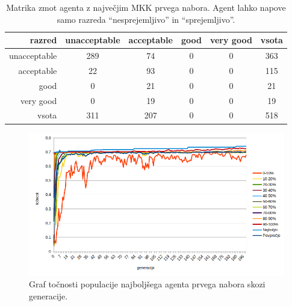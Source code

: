 \begin{table}[H]
    \centering
    \begin{tabular}{||rccccc||}
        \hline
        razred       & unacceptable & acceptable & good & very good & vsota \\ \hline
        unacceptable & 289          & 74         & 0    & 0         & 363   \\ \hline
        acceptable   & 22           & 93         & 0    & 0         & 115   \\ \hline
        good         & 0            & 21         & 0    & 0         & 21    \\ \hline
        very good    & 0            & 19         & 0    & 0         & 19    \\ \hline
        vsota        & 311          & 207        & 0    & 0         & 518   \\ \hline
    \end{tabular}
    \caption{Matrika zmot agenta z največjim MKK prvega nabora. Agent lahko napove samo razreda \enquote{nesprejemljivo} in \enquote{sprejemljivo}.}
    \label{tab:car_mcc_1}
\end{table}

\begin{figure}[H]
    \begin{center}
        \includegraphics[width=13cm]{car/1/acc}
    \end{center}
    \caption{Graf točnosti populacije najboljšega agenta prvega nabora skozi generacije.}
    \label{fig:car_acc_1}
\end{figure}

